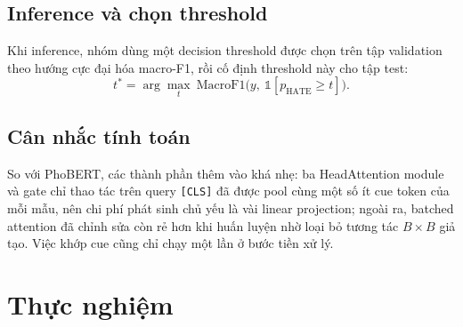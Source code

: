 \documentclass[11pt]{article}
\begin{document}
\subsection{Inference và chọn threshold}
Khi inference, nhóm dùng một decision threshold được chọn trên tập validation theo hướng cực đại hóa macro-F1, rồi cố định threshold này cho tập test:
\begin{equation}
  t^{*} = \arg\max_t\ \mathrm{MacroF1}\big(y,\ \mathbb{1}[p_{\mathrm{HATE}}\ge t]\big).
\end{equation}

\subsection{Cân nhắc tính toán}
So với PhoBERT, các thành phần thêm vào khá nhẹ: ba HeadAttention module và gate chỉ thao tác trên query \texttt{[CLS]} đã được pool cùng một số ít cue token của mỗi mẫu, nên chi phí phát sinh chủ yếu là vài linear projection; ngoài ra, batched attention đã chỉnh sửa còn rẻ hơn khi huấn luyện nhờ loại bỏ tương tác $B\times B$ giả tạo. Việc khớp cue cũng chỉ chạy một lần ở bước tiền xử lý.

\section{Thực nghiệm}
\end{document}

